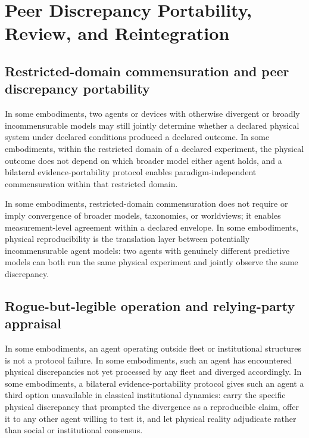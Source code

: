 \documentclass[a4paper,12pt]{article}
\begin{document}
\section{Peer Discrepancy Portability, Review, and Reintegration}
\label{sec:peer-discrepancy}


\subsection{Restricted-domain commensuration and peer discrepancy
  portability}
\label{sec:commensuration}

In some embodiments, two agents or devices with otherwise divergent or
broadly incommensurable models may still jointly determine whether a
declared physical system under declared conditions produced a declared
outcome. In some embodiments, within the restricted domain of a
declared experiment, the physical outcome does not depend on which
broader model either agent holds, and a bilateral
evidence-portability protocol enables paradigm-independent
commensuration within that restricted domain.

In some embodiments, restricted-domain commensuration does not require
or imply convergence of broader models, taxonomies, or worldviews; it
enables measurement-level agreement within a declared envelope. In
some embodiments, physical reproducibility is the translation layer
between potentially incommensurable agent models: two agents with
genuinely different predictive models can both run the same physical
experiment and jointly observe the same discrepancy.

\subsection{Rogue-but-legible operation and relying-party appraisal}


In some embodiments, an agent operating outside fleet or institutional
structures is not a protocol failure. In some embodiments, such an
agent has encountered physical discrepancies not yet processed by any
fleet and diverged accordingly. In some embodiments, a bilateral
evidence-portability protocol gives such an agent a third option
unavailable in classical institutional dynamics: carry the specific
physical discrepancy that prompted the divergence as a reproducible
claim, offer it to any other agent willing to test it, and let
physical reality adjudicate rather than social or institutional
consensus.
\end{document}
